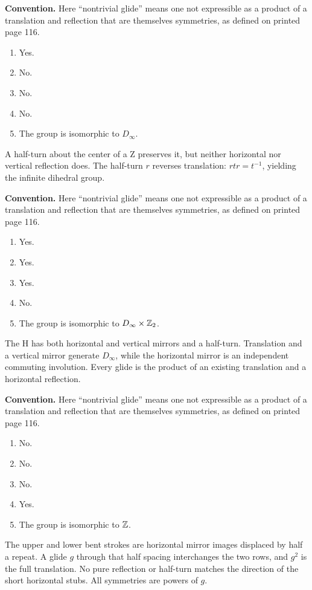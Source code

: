 \textbf{Convention.} Here ``nontrivial glide'' means one not expressible as a product of a translation and reflection that are themselves symmetries, as defined on printed page 116.
\begin{enumerate}[label=(\alph*)]\item Yes.\item No.\item No.\item No.\item The group is isomorphic to $D_\infty$.\end{enumerate}A half-turn about the center of a Z preserves it, but neither horizontal nor vertical reflection does. The half-turn $r$ reverses translation: $rtr=t^{-1}$, yielding the infinite dihedral group.

\textbf{Convention.} Here ``nontrivial glide'' means one not expressible as a product of a translation and reflection that are themselves symmetries, as defined on printed page 116.
\begin{enumerate}[label=(\alph*)]\item Yes.\item Yes.\item Yes.\item No.\item The group is isomorphic to $D_\infty\times\mathbb{Z}_2$.\end{enumerate}The H has both horizontal and vertical mirrors and a half-turn. Translation and a vertical mirror generate $D_\infty$, while the horizontal mirror is an independent commuting involution. Every glide is the product of an existing translation and a horizontal reflection.

\textbf{Convention.} Here ``nontrivial glide'' means one not expressible as a product of a translation and reflection that are themselves symmetries, as defined on printed page 116.
\begin{enumerate}[label=(\alph*)]\item No.\item No.\item No.\item Yes.\item The group is isomorphic to $\mathbb{Z}$.\end{enumerate}The upper and lower bent strokes are horizontal mirror images displaced by half a repeat. A glide $g$ through that half spacing interchanges the two rows, and $g^2$ is the full translation. No pure reflection or half-turn matches the direction of the short horizontal stubs. All symmetries are powers of $g$.

